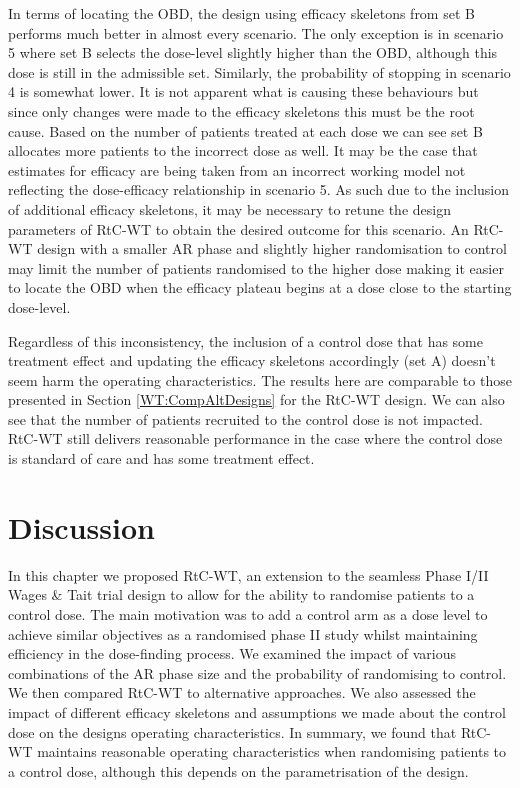 In terms of locating the OBD, the design using efficacy skeletons from set B performs much better in almost every scenario. The only exception is in scenario 5 where set B selects the dose-level slightly higher than the OBD, although this dose is still in the admissible set. Similarly, the probability of stopping in scenario 4 is somewhat lower. It is not apparent what is causing these behaviours but since only changes were made to the efficacy skeletons this must be the root cause. Based on the number of patients treated at each dose we can see set B allocates more patients to the incorrect dose as well. It may be the case that estimates for efficacy are being taken from an incorrect working model not reflecting the dose-efficacy relationship in scenario 5. As such due to the inclusion of additional efficacy skeletons, it may be necessary to retune the design parameters of RtC-WT to obtain the desired outcome for this scenario. An RtC-WT design with a smaller AR phase and slightly higher randomisation to control may limit the number of patients randomised to the higher dose making it easier to locate the OBD when the efficacy plateau begins at a dose close to the starting dose-level.   

Regardless of this inconsistency, the inclusion of a control dose that has some treatment effect and updating the efficacy skeletons accordingly (set A) doesn't seem harm the operating characteristics. The results here are comparable to those presented in Section \ref{WT:CompAltDesigns} for the RtC-WT design. We can also see that the number of patients recruited to the control dose is not impacted. RtC-WT still delivers reasonable performance in the case where the control dose is standard of care and has some treatment effect. 


 \section{Discussion}
 \label{WT:Discussion}

In this chapter we proposed RtC-WT, an extension to the seamless Phase \RN{1}/\RN{2} Wages \& Tait trial design to allow for the ability to randomise patients to a control dose. The main motivation was to add a control arm as a dose level to achieve similar objectives as a randomised phase \RN{2} study whilst maintaining efficiency in the dose-finding process. We examined the impact of various combinations of the AR phase size and the probability of randomising to control. We then compared RtC-WT to alternative approaches. We also assessed the impact of different efficacy skeletons and assumptions we made about the control dose on the designs operating characteristics. In summary, we found that RtC-WT maintains reasonable operating characteristics when randomising patients to a control dose, although this depends on the parametrisation of the design.   

